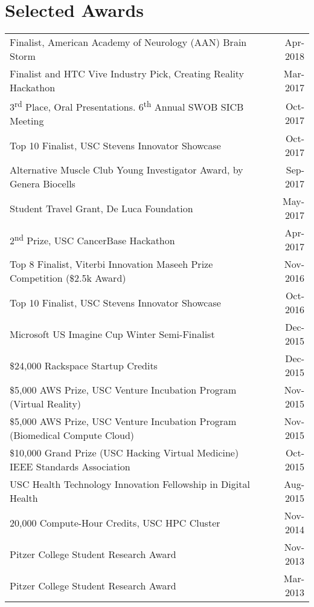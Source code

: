 \documentclass[10pt,a4paper]{article}
\newcommand{\ts}{\textsuperscript}
\begin{document}
  \vspace*{2mm}\section*{Selected Awards}
  
  \vspace*{1mm}\noindent\begin{tabularx}{17cm}{X r}
	Finalist, American Academy of Neurology (AAN) Brain Storm & Apr-2018 \\%
	Finalist and HTC Vive Industry Pick, Creating Reality Hackathon & Mar-2017 \\%
    3\ts{rd} Place, Oral Presentations. 6\ts{th} Annual SWOB SICB Meeting & Oct-2017\\ %
    Top 10 Finalist, USC Stevens Innovator Showcase & Oct-2017 \\%
    Alternative Muscle Club Young Investigator Award, by Genera Biocells & Sep-2017\\
    Student Travel Grant, De Luca Foundation & May-2017\\ %
    2\ts{nd} Prize, USC CancerBase Hackathon & Apr-2017 \\ %
    Top 8 Finalist, Viterbi Innovation Maseeh Prize Competition (\$2.5k Award) & Nov-2016 \\ %
    Top 10 Finalist, USC Stevens Innovator Showcase & Oct-2016 \\ %
    Microsoft US Imagine Cup Winter Semi-Finalist & Dec-2015 \\
    \$24,000 Rackspace Startup Credits & Dec-2015\\
    \$5,000 AWS Prize, USC Venture Incubation Program (Virtual Reality) & Nov-2015\\
    \$5,000 AWS Prize, USC Venture Incubation Program (Biomedical Compute Cloud) & Nov-2015\\
    \$10,000 Grand Prize (USC Hacking Virtual Medicine) IEEE Standards Association  & Oct-2015\\ %
    USC Health Technology Innovation Fellowship in Digital Health & Aug-2015\\ 

    20,000 Compute-Hour Credits, USC HPC Cluster & Nov-2014 \\
    Pitzer College Student Research Award & Nov-2013 \\
    Pitzer College Student Research Award & Mar-2013 \\
  \end{tabularx}
\end{document}
